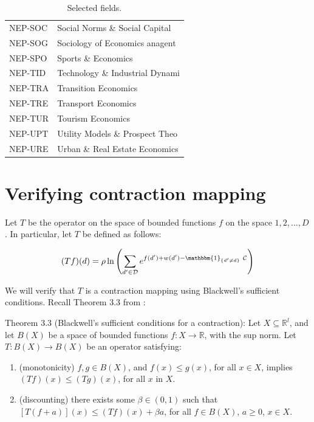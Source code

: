 \begin{table}[!ht]
{\begin{tabular}{ll}
        NEP-SOC   & Social Norms \& Social Capital\\
        NEP-SOG   & Sociology of Economics anagent\\
        NEP-SPO   & Sports \& Economics\\
        NEP-TID   & Technology \& Industrial Dynami\\
        NEP-TRA   & Transition Economics\\
        NEP-TRE   & Transport Economics\\
        NEP-TUR   & Tourism Economics\\
        NEP-UPT   & Utility Models \& Prospect Theo\\
        NEP-URE   & Urban \& Real Estate Economics \\ \hline

    \end{tabular}}
    \caption{Selected fields.}
\end{table}

\section{Verifying contraction mapping}
\label{sec:contr_map}

Let $T$ be the operator on the space of bounded functions $f$ on the
space $1,2,\dots,D$. In particular, let $T$ be defined as follows:

\begin{equation}
    (Tf)(d) = \rho \ln\left( \sum_{d' \in \mathcal{D}} e^{f(d') + w(d') - \mathbbm{1}_{\{d'\neq d\}} \ \mathcal{C}} \right)    
    \label{eq:operator}
\end{equation}

We will verify that $T$ is a contraction mapping using Blackwell's
sufficient conditions. Recall Theorem 3.3 from
\citet{stokey1989recursive}:

Theorem 3.3 (Blackwell's sufficient conditions for a contraction): Let
$X \subseteq \mathbb{R}^l$, and let $B(X)$ be a space of bounded
functions $f:X\rightarrow \mathbb{R}$, with the sup norm. Let
$T: B(X) \rightarrow B(X)$ be an operator satisfying:

\begin{enumerate}
\def\labelenumi{\alph{enumi}.}
\itemsep1pt\parskip0pt
\item
  (monotonicity) $f, g \in B(X)$, and $f(x) \leq g(x)$, for all
  $x \in X$, implies $(Tf)(x) \leq (Tg)(x)$, for all $x$ in $X$.
\item
  (discounting) there exists some $\beta \in (0,1)$ such that
  $[T(f + a)](x) \leq (Tf)(x) + \beta a$, for all $f \in B(X) $,
  $a \geq 0$, $x\in X$.
\end{enumerate}

